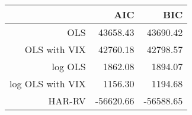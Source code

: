 \begin{table}[ht]
\centering
\begin{tabular}{rrr}
  \hline
 & AIC & BIC \\ 
  \hline
OLS & 43658.43 & 43690.42 \\ 
  OLS with VIX & 42760.18 & 42798.57 \\ 
  log OLS & 1862.08 & 1894.07 \\ 
  log OLS with VIX & 1156.30 & 1194.68 \\ 
  HAR-RV & -56620.66 & -56588.65 \\ 
   \hline
\end{tabular}
\end{table}
